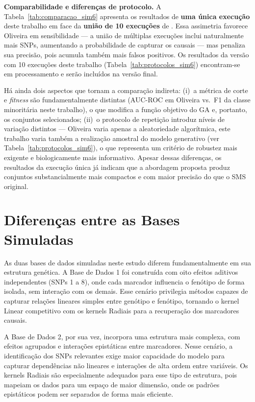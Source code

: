 \documentclass[
    12pt,
    a4paper,
    oneside,
    english,
    french,
    spanish,
    brazil
    ]{abntex2}
\newcommand{\novo}[1]{\textcolor{corNova}{#1}}
\begin{document}
\novo{\textbf{Comparabilidade e diferenças de protocolo.}
A Tabela~\ref{tab:comparacao_sim6} apresenta os resultados de \textbf{uma única execução} deste trabalho em face da \textbf{união de 10 execuções} de \citeonline{Oliveira2015}. Essa assimetria favorece Oliveira em sensibilidade --- a união de múltiplas execuções inclui naturalmente mais SNPs, aumentando a probabilidade de capturar os causais --- mas penaliza sua precisão, pois acumula também mais falsos positivos. Os resultados da versão com 10 execuções deste trabalho (Tabela~\ref{tab:protocolos_sim6}) encontram-se em processamento e serão incluídos na versão final.}

\novo{Há ainda dois aspectos que tornam a comparação indireta: (i)~a métrica de corte e \textit{fitness} são fundamentalmente distintas (AUC-ROC em Oliveira vs.\ F1 da classe minoritária neste trabalho), o que modifica a função objetivo do GA e, portanto, os conjuntos selecionados; (ii)~o protocolo de repetição introduz níveis de variação distintos --- Oliveira varia apenas a aleatoriedade algorítmica, este trabalho varia também a realização amostral do modelo generativo (ver Tabela~\ref{tab:protocolos_sim6}), o que representa um critério de robustez mais exigente e biologicamente mais informativo. Apesar dessas diferenças, os resultados da execução única já indicam que a abordagem proposta produz conjuntos substancialmente mais compactos e com maior precisão do que o SMS original.}

\chapter{Diferenças entre as Bases Simuladas}

\novo{As duas bases de dados simuladas neste estudo diferem fundamentalmente em sua estrutura genética. A Base de Dados 1 foi construída com oito efeitos aditivos independentes (SNPs 1 a 8), onde cada marcador influencia o fenótipo de forma isolada, sem interação com os demais. Esse cenário privilegia métodos capazes de capturar relações lineares simples entre genótipo e fenótipo, tornando o kernel Linear competitivo com os kernels Radiais para a recuperação dos marcadores causais.}

\novo{A Base de Dados 2, por sua vez, incorpora uma estrutura mais complexa, com efeitos agrupados e interações epistáticas entre marcadores. Nesse cenário, a identificação dos SNPs relevantes exige maior capacidade do modelo para capturar dependências não lineares e interações de alta ordem entre variáveis. Os kernels Radiais são especialmente adequados para esse tipo de estrutura, pois mapeiam os dados para um espaço de maior dimensão, onde os padrões epistáticos podem ser separados de forma mais eficiente.}
\end{document}
